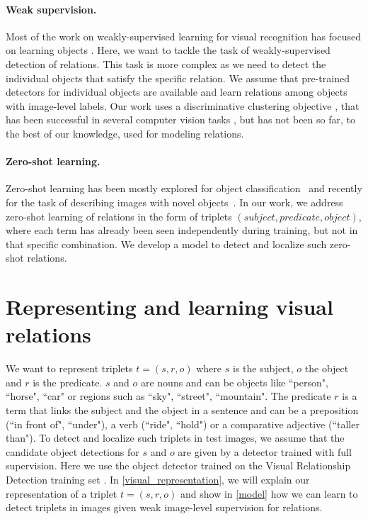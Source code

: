 \documentclass[10pt,twocolumn,letterpaper]{article}
\newcommand{\spaceparagraph}{\vspace{-.35cm}}
\begin{document}
\spaceparagraph
\paragraph{Weak supervision.} Most of the work on weakly-supervised learning for visual recognition has focused on learning objects \cite{ Bilen16,fangCVPR15,Oquab15}. Here, we want to tackle the task of weakly-supervised detection of relations. This task is more complex as we need to detect the individual objects that satisfy the specific relation. We assume that pre-trained detectors for individual objects are available and learn relations among objects with image-level labels. Our work uses a discriminative clustering objective \cite{bach2008diffrac}, that has been successful in several computer vision tasks \cite{Bojanowski2014,joulin2014}, but has not been so far, to the best of our knowledge, used for modeling relations.




\spaceparagraph
\paragraph{Zero-shot learning.} Zero-shot learning has been mostly explored for object classification~\cite{Frome2013,Lazaridou2014a,Socher2013a,Xian16} and recently for the task of describing images with novel objects~\cite{Hendricks2015,Venugopalan2016}. In our work, we address zero-shot learning of relations in the form of triplets $(subject,predicate,object)$, where each term has already been seen independently during training, but not in that specific combination. We develop a model to detect and localize such zero-shot relations. 




\section{Representing and learning visual relations}


We want to represent triplets $t = (s, r, o)$ where $s$ is the
subject, $o$ the object and $r$ is the predicate. $s$ and $o$ are
nouns and can be objects like ``person", ``horse", ``car" or regions such as  ``sky",
``street", ``mountain". The predicate $r$ is a term that links the subject and the object in a sentence and can be a preposition (``in front of", ``under"), a verb (``ride", ``hold") or a comparative adjective (``taller than"). To detect and localize such triplets in test images, we assume that the candidate object detections for $s$ and $o$ are given by a detector trained with full supervision. Here we use the object detector \cite{girshick15fastrcnn} trained on the Visual Relationship Detection training set \cite{Lu16}. In \ref{visual_representation}, we will explain our representation of a triplet $t = (s, r, o)$  and show in \ref{model} how we can learn to detect triplets in images given weak image-level supervision for relations. 
\end{document}
